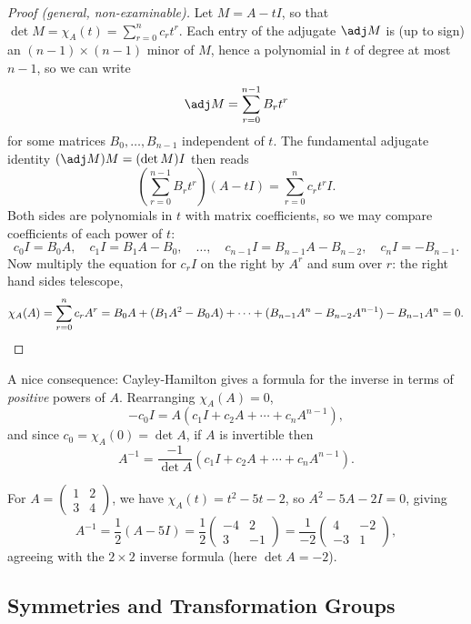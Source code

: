\begin{proof}[Proof (general, non-examinable)]
	Let $M = A - tI$, so that $\det M = \chi_A(t) = \sum_{r = 0}^n c_r t^r$. Each entry of the adjugate $\adj M$ is (up to sign) an $(n-1) \times (n-1)$ minor of $M$, hence a polynomial in $t$ of degree at most $n - 1$, so we can write
	$$
	\adj M = \sum_{r = 0}^{n - 1}B_r t^r
	$$
	for some matrices $B_0, \dots, B_{n-1}$ independent of $t$. The fundamental adjugate identity $(\adj M) M = (\det M) I$ then reads
	$$
	\left(\sum_{r=0}^{n-1}B_rt^r\right)(A - tI) = \sum_{r = 0}^n c_r t^r I.
	$$
	Both sides are polynomials in $t$ with matrix coefficients, so we may compare coefficients of each power of $t$:
	$$
	c_0 I = B_0 A, \quad c_1I = B_1 A - B_0, \quad \dots, \quad c_{n-1}I = B_{n - 1}A - B_{n-2}, \quad c_n I = -B_{n-1}.
	$$
	Now multiply the equation for $c_r I$ on the right by $A^r$ and sum over $r$: the right hand sides telescope,
	$$
	\chi_A(A) = \sum_{r = 0}^n c_r A^r = B_0 A + (B_1A^2 - B_0 A) + \cdots + (B_{n-1}A^n - B_{n - 2}A^{n-1}) - B_{n-1}A^n = 0. \qedhere
	$$
\end{proof}

A nice consequence: Cayley-Hamilton gives a formula for the inverse in terms of \emph{positive} powers of $A$. Rearranging $\chi_A(A) = 0$,
$$
-c_0 I = A(c_1 I + c_2 A + \cdots + c_n A^{n-1}),
$$
and since $c_0 = \chi_A(0) = \det A$, if $A$ is invertible then
$$
A^{-1} = \frac{-1}{\det A}\left(c_1 I + c_2 A + \cdots + c_n A^{n-1}\right).
$$

\begin{example}
	For $A = \begin{pmatrix} 1 & 2 \\ 3 & 4\end{pmatrix}$, we have $\chi_A(t) = t^2 - 5t - 2$, so $A^2 - 5A - 2I = 0$, giving
	$$
	A^{-1} = \frac{1}{2}(A - 5I) = \frac{1}{2}\begin{pmatrix}
		-4 & 2 \\ 3 & -1
	\end{pmatrix} = \frac{1}{-2}\begin{pmatrix}
		4 & -2 \\ -3 & 1
	\end{pmatrix},
	$$
	agreeing with the $2 \times 2$ inverse formula (here $\det A = -2$).
\end{example}

\subsection{Symmetries and Transformation Groups}

